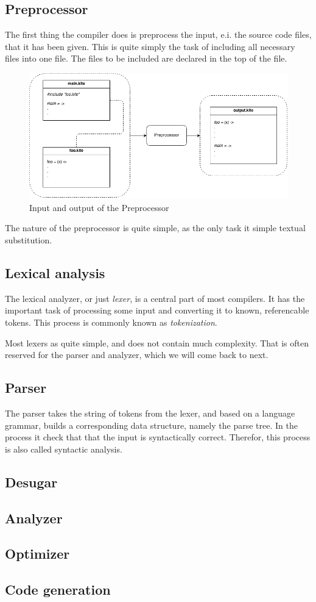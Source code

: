 \subsection{Preprocessor}
The first thing the compiler does is preprocess the input, e.i. the
source code files, that it has been given. This is quite simply the
task of including all necessary files into one file. The files to be
included are declared in the top of the file.

\begin{figure}[H]
  \label{fig:preprocessor}
  \center
  \includegraphics[scale=0.45]{images/preprocessor.png}
  \caption{Input and output of the Preprocessor}
\end{figure}

The nature of the preprocessor is quite simple, as the only task it
simple textual substitution.

\subsection{Lexical analysis}
The lexical analyzer, or just \emph{lexer}, is a central part of most
compilers. It has the important task of processing some input and
converting it to known, referencable tokens. This process is commonly
known as \emph{tokenization}.

Most lexers as quite simple, and does not contain much
complexity. That is often reserved for the parser and analyzer, which
we will come back to next.

\subsection{Parser}
The parser takes the string of tokens from the lexer, and based on a
language grammar, builds a corresponding data structure, namely the
parse tree. In the process it check that that the input is
syntactically correct. Therefor, this process is also called syntactic
analysis.

\subsection{Desugar}

\subsection{Analyzer}

\subsection{Optimizer}

\subsection{Code generation}
